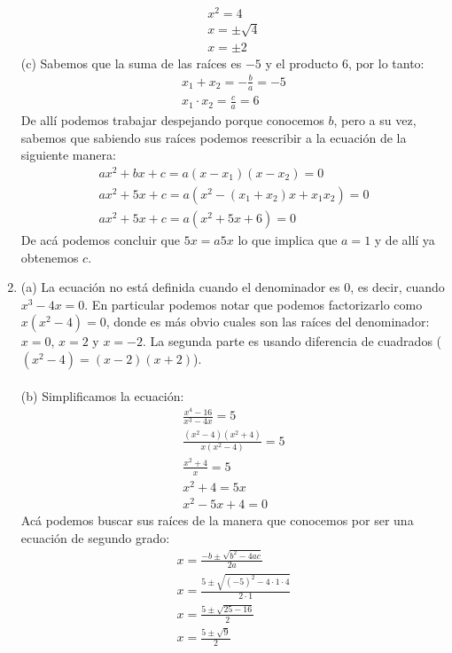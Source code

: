 \documentclass[a4paper]{article}
\begin{document}
\begin{enumerate}
        \begin{gather*}
            x^2=4\\
            x=\pm\sqrt{4}\\
            x=\pm 2
        \end{gather*}
        (c) Sabemos que la suma de las raíces es $-5$ y el producto $6$, por lo tanto:
        \begin{gather*}
            x_1+x_2=-\frac{b}{a}=-5\\
            x_1 \cdot x_2=\frac{c}{a}=6
        \end{gather*}
        De allí podemos trabajar despejando porque conocemos $b$, pero a su vez, sabemos que sabiendo sus raíces podemos reescribir a la ecuación de la siguiente manera:
        \begin{gather*}
            ax^2+bx+c=a(x-x_1)(x-x_2)=0\\
            ax^2+5x+c=a(x^2-(x_1+x_2)x+x_1x_2)=0\\
            ax^2+5x+c=a(x^2+5x+6)=0 
        \end{gather*}
        De acá podemos concluir que $5x=a5x$ lo que implica que $a=1$ y de allí ya obtenemos $c$.
        \item (a) La ecuación no está definida cuando el denominador es 0, es decir, cuando $x^3-4x=0$. En particular podemos notar que podemos factorizarlo como $x(x^2-4)=0$, donde es más obvio cuales son las raíces del denominador: $x=0$, $x=2$ y $x=-2$. La segunda parte es usando diferencia de cuadrados ($(x^2-4)=(x-2)(x+2)$).\\\\
        (b) Simplificamos la ecuación:
        \begin{gather}
            \frac{x^4-16}{x^3-4x}=5\\
            \frac{(x^2-4)(x^2+4)}{x(x^2-4)}=5\\
            \frac{x^2+4}{x}=5\\
            x^2+4=5x\\
            x^2-5x+4=0
        \end{gather}
        Acá podemos buscar sus raíces de la manera que conocemos por ser una ecuación de segundo grado:
        \begin{gather*}
            x=\frac{-b\pm\sqrt{b^2-4ac}}{2a}\\
            x=\frac{5\pm\sqrt{(-5)^2-4\cdot 1 \cdot 4}}{2\cdot 1}\\
            x=\frac{5\pm\sqrt{25-16}}{2}\\
            x=\frac{5\pm\sqrt{9}}{2}\\

\end{gather*}
\end{enumerate}
\end{document}
